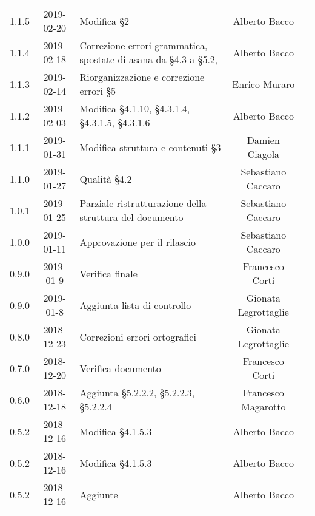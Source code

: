 {\begin{longtable}{ c c C{4cm} c c }
		1.1.5 & 2019-02-20 & Modifica §2 & Alberto Bacco & \reda{} \\
		
		1.1.4 & 2019-02-18 & Correzione errori grammatica, spostate di asana da §4.3 a §5.2, & Alberto Bacco & \reda{} \\
		
		1.1.3 & 2019-02-14 & Riorganizzazione e correzione errori §5 & Enrico Muraro & \reda{} \\
		
		1.1.2 & 2019-02-03 & Modifica §4.1.10, §4.3.1.4, §4.3.1.5, §4.3.1.6 & Alberto Bacco& \reda{} \\	
		
		1.1.1 & 2019-01-31 & Modifica struttura e contenuti §3 & Damien Ciagola & \reda{} \\	
		
		1.1.0 & 2019-01-27 & Qualità §4.2 & Sebastiano Caccaro & \reda{} \\	
		
		1.0.1 & 2019-01-25 & Parziale ristrutturazione della struttura del documento & Sebastiano Caccaro & \reda{} \\		
		
		1.0.0 & 2019-01-11 & Approvazione per il rilascio & Sebastiano Caccaro & \Res{} \\
		
		0.9.0 & 2019-01-9 & Verifica finale & Francesco Corti & \ver{} \\
		
		0.9.0 & 2019-01-8 & Aggiunta lista di controllo & Gionata Legrottaglie & \reda{} \\
		
		0.8.0 & 2018-12-23 & Correzioni errori ortografici & Gionata Legrottaglie & \reda{} \\
		
		0.7.0 & 2018-12-20 & Verifica documento & Francesco Corti & \ver{}\\
		
		0.6.0 & 2018-12-18 & Aggiunta §5.2.2.2, §5.2.2.3, §5.2.2.4 & Francesco Magarotto & \reda{} \\
		
		0.5.2 & 2018-12-16 & Modifica §4.1.5.3 & Alberto Bacco & \reda{} \\
		
		0.5.2 & 2018-12-16 & Modifica §4.1.5.3 & Alberto Bacco & \reda{} \\
		
		0.5.2 & 2018-12-16 & Aggiunte  & Alberto Bacco & \reda{} \\
		

\end{longtable}}

